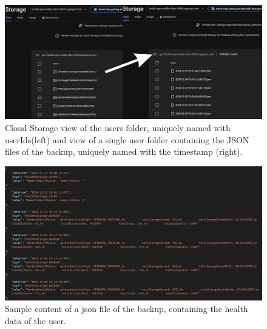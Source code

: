 \begin{figure}
    \includegraphics[width=1.0\linewidth]{./images/backup.jpg}
    \caption{Cloud Storage view of the users folder, uniquely named with userIds(left) and view of a single user folder containing the JSON files of the backup, uniquely named with the timestamp (right).}
\end{figure}

\begin{figure}
    \centering
    \includegraphics[width=1.0\linewidth]{./images/backup_json.png}
    \caption{Sample content of a json file of the backup, containing the health data of the user.}
\end{figure}
\clearpage
